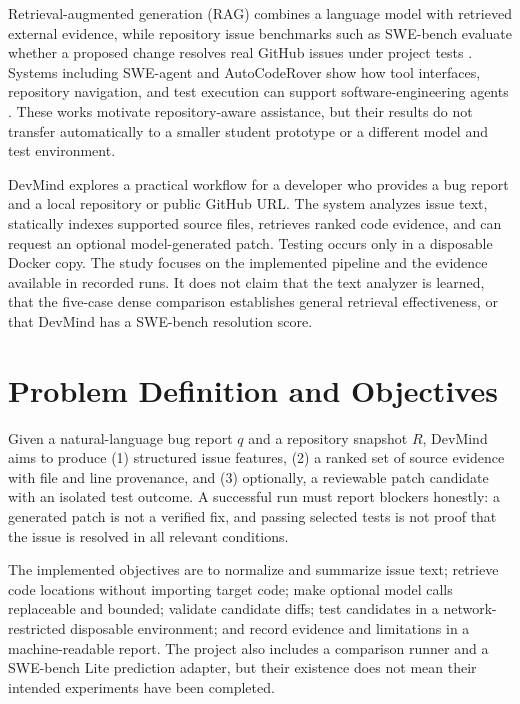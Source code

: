 \documentclass[3p,times,procedia]{elsarticle}
\begin{document}
Retrieval-augmented generation (RAG) combines a language model with retrieved external evidence, while repository issue benchmarks such as SWE-bench evaluate whether a proposed change resolves real GitHub issues under project tests \cite{Lewis2020,Jimenez2024}. Systems including SWE-agent and AutoCodeRover show how tool interfaces, repository navigation, and test execution can support software-engineering agents \cite{Yang2024,Zhang2024}. These works motivate repository-aware assistance, but their results do not transfer automatically to a smaller student prototype or a different model and test environment.

DevMind explores a practical workflow for a developer who provides a bug report and a local repository or public GitHub URL. The system analyzes issue text, statically indexes supported source files, retrieves ranked code evidence, and can request an optional model-generated patch. Testing occurs only in a disposable Docker copy. The study focuses on the implemented pipeline and the evidence available in recorded runs. It does not claim that the text analyzer is learned, that the five-case dense comparison establishes general retrieval effectiveness, or that DevMind has a SWE-bench resolution score.

\section{Problem Definition and Objectives}
Given a natural-language bug report $q$ and a repository snapshot $R$, DevMind aims to produce (1) structured issue features, (2) a ranked set of source evidence with file and line provenance, and (3) optionally, a reviewable patch candidate with an isolated test outcome. A successful run must report blockers honestly: a generated patch is not a verified fix, and passing selected tests is not proof that the issue is resolved in all relevant conditions.

The implemented objectives are to normalize and summarize issue text; retrieve code locations without importing target code; make optional model calls replaceable and bounded; validate candidate diffs; test candidates in a network-restricted disposable environment; and record evidence and limitations in a machine-readable report. The project also includes a comparison runner and a SWE-bench Lite prediction adapter, but their existence does not mean their intended experiments have been completed.
\end{document}
